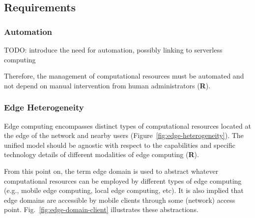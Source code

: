\subsection{Requirements}\label{sec:requirements}


\subsubsection{Automation}


TODO: introduce the need for automation, possibly linking to serverless computing

Therefore, the management of computational resources must be automated and not depend on  manual intervention from human administrators (\textbf{R}).


\subsubsection{Edge Heterogeneity}


Edge computing encompasses distinct types of computational resources located at the edge of the network and nearby users (Figure~\ref{fig:edge-heterogeneity}). The unified model should be agnostic with respect to the capabilities and specific technology details of different modalities of edge computing (\textbf{R}).

From this point on, the term edge domain is used to abstract whatever computational resources can be employed by different types of edge computing (e.g., mobile edge computing, local edge computing, etc). It is also implied that edge domains are accessible by mobile clients through some (network) access point. Fig.~\ref{fig:edge-domain-client} illustrates these abstractions. 

